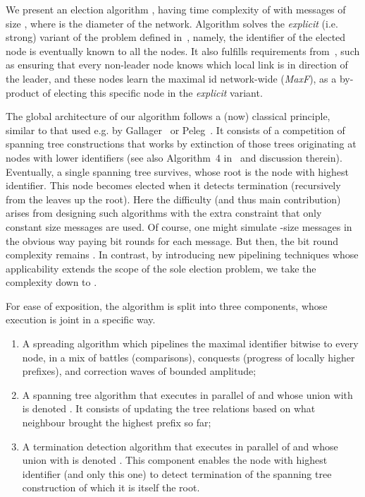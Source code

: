 \documentclass[11pt,envcountsame,letterpaper]{llncs}
\begin{document}
We present an election algorithm \STT, having time complexity of  with messages of size , where  is the diameter of the network.
Algorithm \STT solves the {\em explicit} (i.e. strong) variant of the problem defined in~\cite{KPPRT15}, namely, the identifier of the elected node is eventually known to all the nodes. It also fulfills requirements from~\cite{DS07}, such as ensuring that every non-leader node knows which local link is in direction of the leader, and these nodes learn the maximal id network-wide ({\em MaxF}), as a by-product of electing this specific node in the {\em explicit} variant.

The global architecture of our algorithm follows a (now) classical principle, similar to that used e.g. by Gallager~\cite{Gallager} or Peleg~\cite{Peleg90}. It consists of a competition of spanning tree constructions that works by extinction of those trees originating at nodes with lower identifiers (see also Algorithm~4 in~\cite{Attiya} and discussion therein). Eventually, a single spanning tree survives, whose root is the node with highest identifier. This node becomes elected when it detects termination (recursively from the leaves up the root). Here the difficulty (and thus main contribution) arises from designing such algorithms with the extra constraint that only constant size messages are used. Of course, one might simulate -size messages in the obvious way paying  bit rounds for each message. But then, the bit round complexity remains . In contrast, by introducing new pipelining techniques whose applicability extends the scope of the sole election problem, we take the complexity down to .

For ease of exposition, the  algorithm is split into three components, whose execution is joint in a specific way.

\begin{enumerate}
\item A spreading algorithm  which pipelines the maximal identifier bitwise to every node, in a mix of battles (comparisons), conquests (progress of locally higher prefixes), and correction waves of bounded amplitude;
\item A spanning tree algorithm that executes in parallel of  and whose union with  is denoted . It consists of updating the tree relations based on what neighbour brought the highest prefix so far;
\item A termination detection algorithm that executes in parallel of  and whose union with  is denoted . This component enables the node with highest identifier (and only this one) to detect termination of
the spanning tree construction of which it is itself the root.
\end{enumerate}
\end{document}
